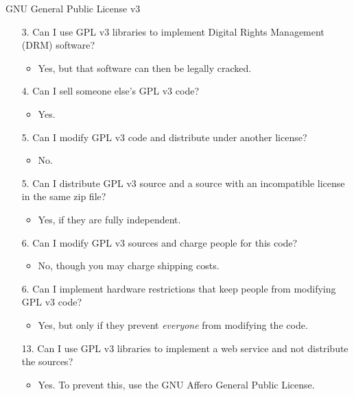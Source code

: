 \documentclass{beamer}
\begin{document}
\begin{frame}{GNU General Public License v3 \hfill\href{http://www.gnu.org/copyleft/gpl.html}{}}
\begin{itemize}
\item[3.] Can I use GPL v3 libraries to implement Digital Rights Management (DRM) software? \\
\begin{itemize}
\item<2->Yes, but that software can then be legally cracked.
\end{itemize}
\item[4.] Can I sell someone else's GPL v3 code?
\begin{itemize}
\item<2->Yes.
\end{itemize}
\item[5.] Can I modify GPL v3 code and distribute under another license?
\begin{itemize}
\item<2-> No.
\end{itemize}
\item[5.] Can I distribute GPL v3 source and a source with an incompatible license in the same zip file?
\begin{itemize}
\item<2->Yes, if they are fully independent.
\end{itemize}
\item[6.] Can I modify GPL v3 sources and charge people for this code?
\begin{itemize}
\item<2-> No, though you may charge shipping costs.
\end{itemize}
\item[6.] Can I implement hardware restrictions that keep people from modifying GPL v3 code?
\begin{itemize}
\item<2-> Yes, but only if they prevent \emph{everyone} from modifying the code.
\end{itemize}
\item[13.] Can I use GPL v3 libraries to implement a web service and not distribute the sources?
\begin{itemize}
\item<2-> Yes. To prevent this, use the GNU Affero General Public License.
\end{itemize}
\end{itemize}
\end{frame}
\end{document}
